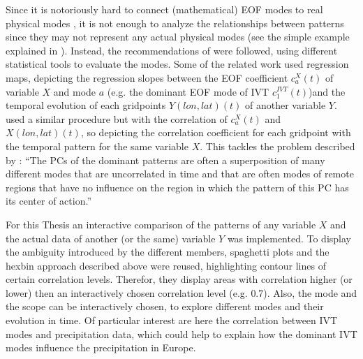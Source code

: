 Since it is notoriously hard to connect (mathematical) EOF modes to real physical modes \cite{hannachi_empirical_2007, dommenget_cautionary_2002}, it is not enough to analyze the relationships between patterns since they may not represent any actual physical modes (see the simple example explained in ). 
Instead, the recommendations of  were followed, using different statistical tools to evaluate the modes. 
Some of the related work \cite{zou_interdecadal_2018, zhou_atmospheric_2005, li_quasi-4-yr_2012} used regression maps, depicting the regression slopes between the EOF coefficient $c_a^X(t)$ of variable $X$ and mode $a$ (e.g. the dominant EOF mode of IVT $c_1^{IVT}(t)$)and the temporal evolution of each gridpoints $Y(lon, lat)(t)$ of another variable $Y$. 
 used a similar procedure but with the correlation of $c_a^X(t)$ and $X(lon, lat)(t)$, so depicting the correlation coefficient for each gridpoint with the temporal pattern for the same variable $X$. 
This tackles the problem described by \citeauthor{dommenget_cautionary_2002}: \enquote{The PCs of the dominant patterns are often a superposition of many different modes that are uncorrelated in time and that are often modes of remote regions that have no influence on the region in which the pattern of this PC has its center of action.} \cite{dommenget_cautionary_2002} 


For this Thesis an interactive comparison of the patterns of any variable $X$ and the actual data of another (or the same) variable $Y$ was implemented.
To display the ambiguity introduced by the different members, spaghetti plots and the hexbin approach described above were reused, highlighting contour lines of certain correlation levels. 
Therefor, they display areas with correlation higher (or lower) then an interactively chosen correlation level (e.g. $0.7$). 
Also, the mode and the scope can be interactively chosen, to explore different modes and their evolution in time. 
Of particular interest are here the correlation between IVT modes and precipitation data, which could help to explain how the dominant IVT modes influence the precipitation in Europe. 

%
%
%


